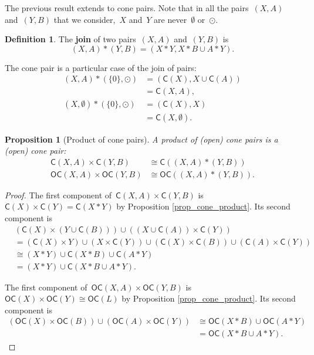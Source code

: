 \documentclass[english,11pt]{article}
\theoremstyle{plain}
\newtheorem{proposition}{Proposition}[section]
\theoremstyle{remark}
\theoremstyle{definition}
\newtheorem{definition}{Definition}[section]
\newcommand{\unit}{\odot}%
\newcommand{\C}[1]{\mathsf{C}(#1)}%
\newcommand{\OC}[1]{\mathsf{OC}(#1)}%
\begin{document}
The previous result extends to cone pairs. Note that in all the pairs~$(X,A)$ and~$(Y,B)$ that we consider,~$X$ and~$Y$ are never~$\emptyset$ or~$\unit$.
\begin{definition}
The \textbf{join} of two pairs~$(X,A)$ and~$(Y,B)$ is
\begin{equation*}
(X,A)*(Y,B)=(X*Y,X*B\cup A*Y).
\end{equation*}
\end{definition}


The cone pair is a particular case of the join of pairs:
\begin{align*}
(X,A)*(\{0\},\unit)&=(\C{X},X\cup\C{A})\\
&=\C{X,A},\\
(X,\emptyset)*(\{0\},\unit)&=(\C{X},X)\\
&=\C{X,\emptyset}.
\end{align*}


\begin{proposition}[Product of cone pairs]\label{prop_cone_pair_product}A product of (open) cone pairs is a (open) cone pair:
\begin{align*}
\C{X,A}\times\C{Y,B}&\cong\C{(X,A)*(Y,B)}\\%
\OC{X,A}\times\OC{Y,B}&\cong\OC{(X,A)*(Y,B)}.%
\end{align*}
\end{proposition}
\begin{proof}
The first component of~$\C{X,A}\times \C{Y,B}$ is~$\C{X}\times\C{Y}=\C{X*Y}$ by Proposition \ref{prop_cone_product}. Its second component is
\begin{align*}
&(\C{X}\times(Y\cup\C{B}))\cup((X\cup \C{A})\times \C{Y})\\
&=(\C{X}\times Y)\cup (X\times \C{Y})\cup (\C{X}\times\C{B})\cup (\C{A}\times\C{Y})\\
&\cong(X*Y)\cup \C{X*B}\cup\C{A*Y}\\
&=(X*Y)\cup \C{X*B\cup A*Y}.
\end{align*}

The first component of~$\OC{X,A}\times \OC{Y,B}$ is~$\OC{X}\times\OC{Y}\cong\OC{L}$ by Proposition \ref{prop_cone_product}. Its second component is
\begin{align*}
(\OC{X}\times\OC{B})\cup(\OC{A}\times\OC{Y})&\cong
\OC{X*B}\cup\OC{A*Y}\\
&=\OC{X*B\cup A*Y}.
\end{align*}
\end{proof}
\end{document}
